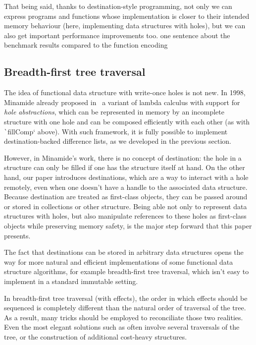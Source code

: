 \documentclass[english]{jflart}
\newcommand{\TODO}[1]{{\color{red}\large #1}}
\begin{document}
That being said, thanks to destination-style programming, not only we can express programs and functions whose implementation is closer to their intended memory behaviour (here, implementing data structures with holes), but we can also get important performance improvements too. \TODO{one sentence about the benchmark results compared to the function encoding}

\clearpage{}

\subsection{Breadth-first tree traversal}\label{ssec:bf-tree-traversal}

The idea of functional data structure with write-once holes is not new. In 1998, Minamide already proposed in~\cite{minamide_functional_1998} a variant of lambda calculus with support for \emph{hole abstractions}, which can be represented in memory by an incomplete structure with one hole and can be composed efficiently with each other (as with \texttt`fillComp` above). With such framework, it is fully possible to implement destination-backed difference lists, as we developed in the previous section.

However, in Minamide's work, there is no concept of destination: the hole in a structure can only be filled if one has the structure itself at hand. On the other hand, our paper introduces destinations, which are a way to interact with a hole remotely, even when one doesn't have a handle to the associated data structure. Because destination are treated as first-class objects, they can be passed around or stored in collections or other structure. Being able not only to represent data structures with holes, but also manipulate references to these holes as first-class objects while preserving memory safety, is the major step forward that this paper presents.

The fact that destinations can be stored in arbitrary data structures opens the way for more natural and efficient implementations of some functional data structure algorithms, for example breadth-first tree traversal, which isn't easy to implement in a standard immutable setting.

In breadth-first tree traversal (with effects), the order in which effects should be sequenced is completely different than the natural order of traversal of the tree. As a result, many tricks should be employed to reconciliate those two realities. Even the most elegant solutions such as \cite{gibbons_phases_2023} often involve several traversals of the tree, or the construction of additional cost-heavy structures.
\end{document}
